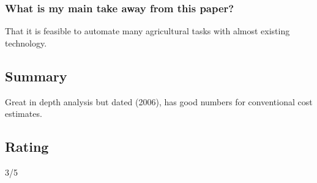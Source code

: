 \documentclass{article}
\begin{document}
\subsubsection*{What is my main take away from this paper?}
That it is feasible to automate many agricultural tasks with almost existing technology.

\subsection*{Summary}
Great in depth analysis but dated (2006), has good numbers for conventional cost estimates.
\subsection*{Rating}
3/5


\newpage


\end{document}
